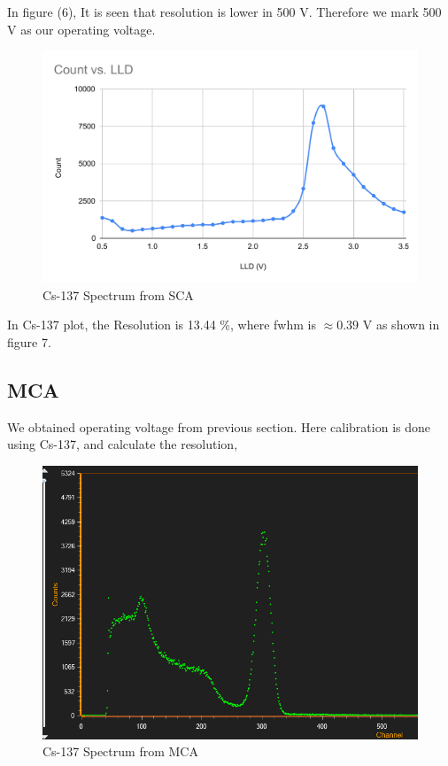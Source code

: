 \documentclass[a4paper, amsfonts, amssymb, amsmath, reprint, showkeys, nofootinbib, twoside]{revtex4-1}
\begin{document}
In figure (6), It is seen that resolution is lower in 500 V. Therefore we mark 500 V as our operating voltage.

\begin{figure}[H]
	\centering
	\includegraphics[scale=0.45]{7}
	\caption{Cs-137 Spectrum from SCA}
\end{figure}

In Cs-137 plot, the Resolution is 13.44 \%,
where fwhm is $\approx0.39$ V as shown in figure 7.

\subsection{MCA}

We obtained operating voltage from previous section. Here calibration is done using Cs-137, and calculate the resolution,

\begin{figure}[H]
	\centering
	\includegraphics[width=\columnwidth]{Cs Spec}
	\caption{Cs-137 Spectrum from MCA}
\end{figure}
\end{document}
